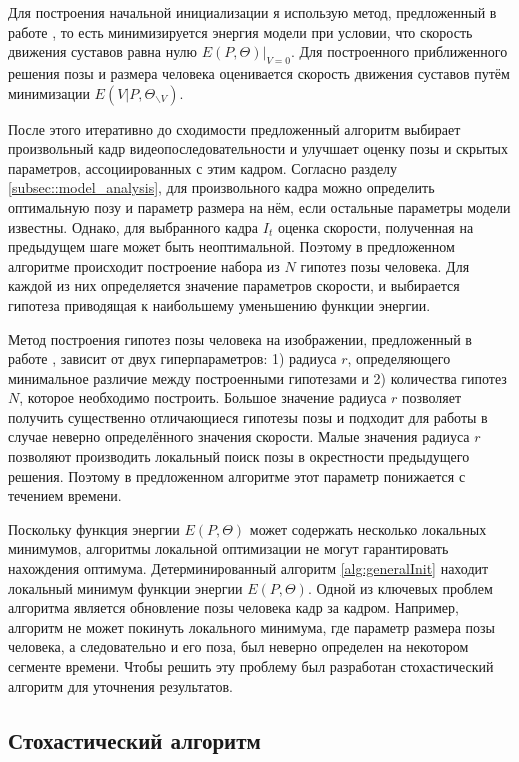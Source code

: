 Для построения начальной инициализации я использую метод, предложенный в работе \cite{park2011n}, то есть минимизируется энергия модели при условии, что скорость движения суставов равна нулю $E(P, \Theta)\bigg\rvert_{V=0}$. Для построенного приближенного решения позы и размера человека оценивается скорость движения суставов путём минимизации $E(V|P, \Theta_{\backslash V})$.

После этого итеративно до сходимости предложенный алгоритм выбирает произвольный кадр видеопоследовательности и улучшает оценку позы и скрытых параметров, ассоциированных с этим кадром. Согласно разделу \ref{subsec::model_analysis}, для произвольного кадра можно определить оптимальную позу и параметр размера на нём, если остальные параметры модели известны. Однако, для выбранного кадра $I_t$ оценка скорости, полученная на предыдущем шаге может быть неоптимальной. Поэтому в предложенном алгоритме происходит построение набора из $N$ гипотез позы человека. Для каждой из них определяется значение параметров скорости, и выбирается гипотеза приводящая к наибольшему уменьшению функции энергии.

Метод построения гипотез позы человека на изображении, предложенный в работе \cite{park2011n}, зависит от двух гиперпараметров: 1) радиуса $r$, определяющего минимальное различие между построенными гипотезами и 2) количества гипотез $N$, которое необходимо построить. Большое значение радиуса $r$ позволяет получить существенно отличающиеся гипотезы позы и подходит для работы в случае неверно определённого значения скорости. Малые значения радиуса $r$ позволяют производить локальный поиск позы в окрестности предыдущего решения. Поэтому в предложенном алгоритме этот параметр понижается с течением времени.

Поскольку функция энергии $E(P, \Theta)$ может содержать несколько локальных минимумов, алгоритмы локальной оптимизации не могут гарантировать нахождения оптимума. Детерминированный алгоритм \ref{alg:generalInit} находит локальный минимум функции энергии $E(P, \Theta)$. Одной из ключевых проблем алгоритма является обновление позы человека кадр за кадром. Например, алгоритм не может покинуть локального минимума, где параметр размера позы человека, а следовательно и его поза, был неверно определен на некотором сегменте времени. Чтобы решить эту проблему был разработан стохастический алгоритм для уточнения результатов.

\subsection{Стохастический алгоритм}

